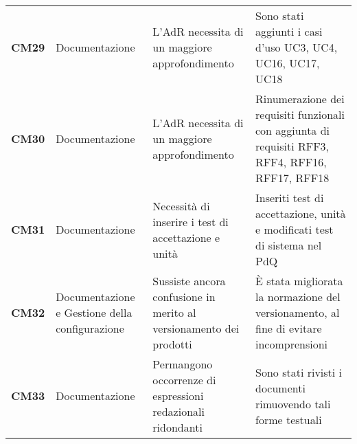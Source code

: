 \documentclass[../piano-di-qualifica.tex]{subfiles}
\begin{document}
\begin{longtable}[H]{>{\centering\bfseries}m{2.5cm} >{\centering}m{2.5cm} >{\centering}m{5.5cm} >{\centering\arraybackslash}m{5.5cm}}
CM29 & Documentazione                                & L’AdR necessita di un maggiore approfondimento                                                                                                                                & Sono stati aggiunti i casi d’uso UC3, UC4, UC16, UC17, UC18                                                                                                                                                                                                                                                                                         \\
CM30 & Documentazione                                & L’AdR necessita di un maggiore approfondimento                                                                                                                                & Rinumerazione dei requisiti funzionali con aggiunta di requisiti RFF3, RFF4, RFF16, RFF17, RFF18                                                                                                                                                                                                                                                    \\
CM31 & Documentazione                                & Necessità di inserire i test di accettazione e unità                                                                                                                          & Inseriti test di accettazione, unità e modificati test di sistema nel PdQ                                                                                                                                                                                                                                                                           \\
CM32 & Documentazione e Gestione della configurazione & Sussiste ancora confusione in merito al versionamento dei prodotti                                                                                                           & È stata migliorata la normazione del versionamento, al fine di evitare incomprensioni                                                                                                                                                                                                                                                               \\
CM33 & Documentazione                                & Permangono occorrenze di espressioni redazionali ridondanti                                                                                                                   & Sono stati rivisti i documenti rimuovendo tali forme testuali                                                                                                                                                                                                                                                                                       \\

\end{longtable}
\end{document}
